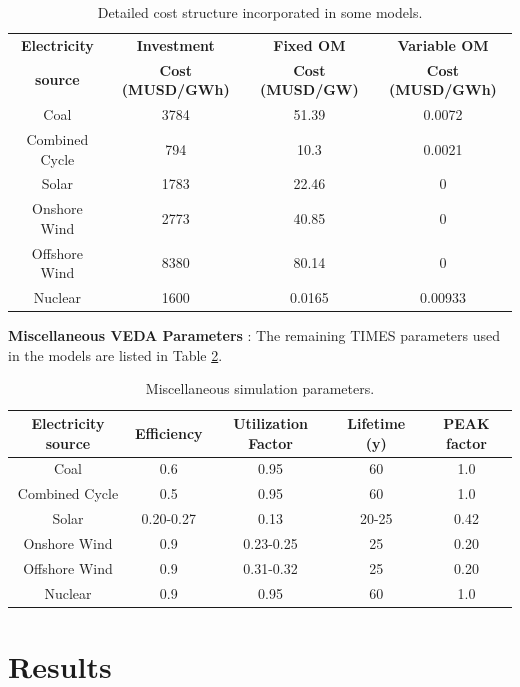 \documentclass[14pt,a4paper]{article} %
\begin{document}
\begin{table}[H]
\centering
\caption{\label{tab:costs} Detailed cost structure incorporated in some models.}
\vspace{2mm}
\begin{tabular}{|c|c|c|c|}
\hline
\textbf{Electricity} & \textbf{Investment} & \textbf{Fixed \gls{OM}} & \textbf{Variable \gls{OM}}\\
\textbf{source} & \textbf{Cost (MUSD/GWh)} & \textbf{Cost (MUSD/GW)} & \textbf{Cost (MUSD/GWh)}\\
\hline
Coal & 3784 & 51.39 & 0.0072\\
\hline
Combined Cycle & 794 & 10.3 & 0.0021\\
\hline
Solar & 1783 & 22.46 & 0 \\
\hline
Onshore Wind & 2773 & 40.85 & 0\\
\hline
Offshore Wind & 8380 & 80.14 & 0\\
\hline
Nuclear & 1600 & 0.0165 & 0.00933\\
\hline
\end{tabular}
\end{table}

\textbf{Miscellaneous VEDA Parameters} \cite{kato_energy_2016,gargiulo_documentation_2005}: The remaining TIMES parameters used in the models are listed in Table \ref{tab:misc}.
\begin{table}[H]
\centering
\caption{\label{tab:misc} Miscellaneous simulation parameters.}
\vspace{2mm}
\begin{tabular}{|c|c|c|c|c|}
\hline
\textbf{Electricity source} & \textbf{Efficiency} & \textbf{Utilization Factor} & \textbf{Lifetime (y)} & \textbf{\gls{PEAK} factor}\\
\hline
Coal & 0.6 & 0.95 & 60 & 1.0 \\
\hline
Combined Cycle & 0.5 & 0.95 & 60 & 1.0 \\
\hline
Solar & 0.20-0.27 & 0.13 & 20-25 & 0.42 \\
\hline
Onshore Wind & 0.9 & 0.23-0.25 & 25 & 0.20 \\
\hline
Offshore Wind & 0.9 & 0.31-0.32 & 25 & 0.20 \\
\hline
Nuclear & 0.9 & 0.95 & 60 & 1.0 \\
\hline
\end{tabular}
\end{table}

\section{Results}
\end{document}
